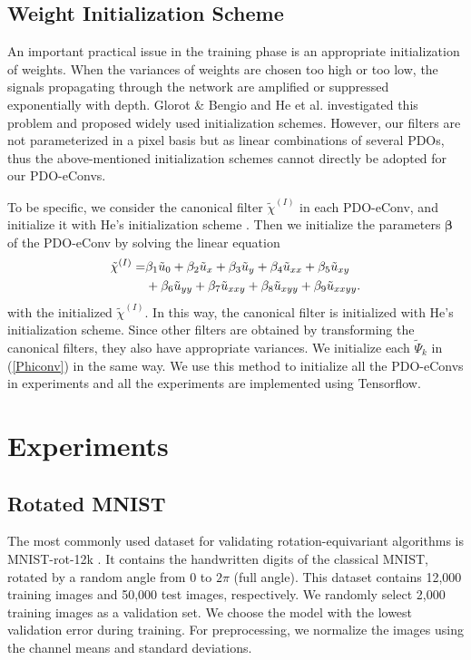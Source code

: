 \documentclass{article}
\begin{document}
\subsection{Weight Initialization Scheme \label{initialize}}
An important practical issue in the training phase is an appropriate initialization of weights.
When the variances of weights are chosen too high or too low, 
the signals propagating through the network are amplified or suppressed exponentially with depth. 
Glorot \& Bengio  and He et al.  investigated this problem and proposed widely used initialization schemes. However, our filters are not parameterized in a pixel basis but as linear combinations of several PDOs,
thus the above-mentioned initialization schemes cannot directly be adopted for our PDO-eConvs.

To be specific, we consider the canonical filter $\tilde \chi^{(I)}$ in each PDO-eConv, and initialize it with He's initialization scheme \cite{he2015delving}. Then we initialize the parameters $\bm{\beta}$ of the PDO-eConv by solving the linear equation
\begin{align}
\tilde \chi^{(I)}=&\beta_1 \tilde u_0+\beta_2 \tilde u_{x}+\beta_3 \tilde u_{y}+\beta_4 \tilde u_{xx}+\beta_5 \tilde u_{xy}\\
&+\beta_6 \tilde u_{yy}+\beta_7 \tilde u_{xxy}+\beta_8 \tilde u_{xyy}+\beta_9 \tilde u_{xxyy}.\notag
\end{align}
with the initialized $\tilde \chi^{(I)}$. In this way, the canonical filter is initialized with He's initialization scheme. Since other filters are obtained by transforming the canonical filters, they also have appropriate variances. We initialize each $\tilde \Psi_k$ in (\ref{Phiconv}) in the same way. We use this method to initialize all the PDO-eConvs in experiments and all the experiments are implemented using Tensorflow.

\section{Experiments}
\subsection{Rotated MNIST}

The most commonly used dataset for validating rotation-equivariant algorithms is MNIST-rot-12k \cite{larochelle2007empirical}. It contains the handwritten digits of the classical MNIST, rotated by a random angle from $0$ to $2\pi$ (full angle). This dataset contains 12,000 training images and 50,000 test images, respectively. We randomly select 2,000 training images as a validation set. We choose the model with the lowest validation error during training. For preprocessing, we normalize the images using the channel means and standard deviations.
\end{document}
